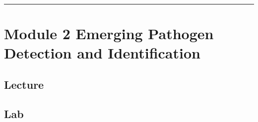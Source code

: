 \documentclass[
]{book}
\begin{document}
\begin{center}\rule{0.5\linewidth}{0.5pt}\end{center}

\chapter{Module 2 Emerging Pathogen Detection and Identification}\label{module-2-emerging-pathogen-detection-and-identification}

\section{Lecture}\label{lecture-1}

\section{Lab}\label{lab-1}
\end{document}
